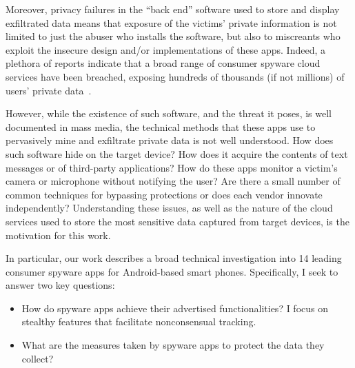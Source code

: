 Moreover, privacy failures in the ``back end'' software used to store and
display exfiltrated data means that exposure of the victims' private information is not limited to just the abuser who installs the software, but also to miscreants who exploit the insecure design and/or implementations of these apps.
Indeed, a plethora of reports indicate that a broad range of consumer spyware cloud services have been breached,
exposing hundreds of thousands (if not millions) of users' private data~\cite{HackerSt66:online,Companyt8:online,mSpybrea38:online,mSpyCybe86:online,Cerberus12:online,Stalkerw59:online,HackerSt50:online,Spywaref13:online,RetinaXa98:online,Hackercl62:online}.

However, while the existence of such software, and the threat it poses,
is well documented in mass media, the technical methods that these apps use to pervasively mine and exfiltrate private data is not well understood.
How does such software hide on
the target device?  How does it acquire the contents of text messages
or of third-party applications? How do these apps monitor a victim's camera or microphone without notifying the user?  Are there a small number of
common techniques for bypassing protections or does each vendor
innovate independently?  Understanding these issues, as well as the
nature of the cloud services used to store the most sensitive data
captured from target devices, is the motivation for this work.

In particular, our work describes a broad technical investigation
into 14 leading consumer spyware apps for Android-based smart
phones.
Specifically, I seek to answer two key questions:
\begin{itemize}
    \item How do spyware apps achieve their advertised functionalities? I focus on stealthy features that facilitate nonconsensual tracking.
    \item What are the measures taken by spyware apps to protect the data they collect?
\end{itemize}


